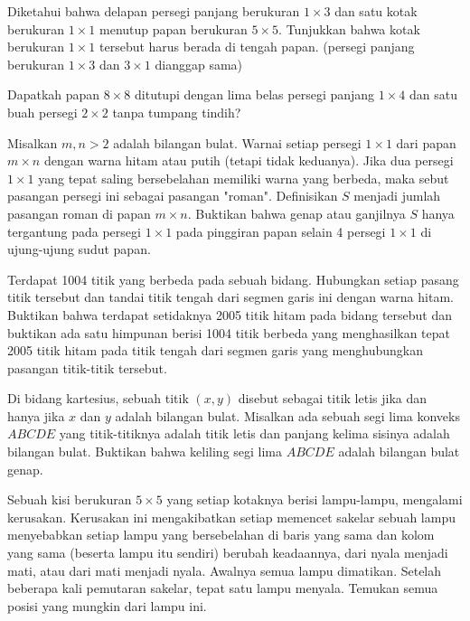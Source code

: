 \documentclass[11pt]{scrartcl}
\begin{document}
\begin{soaljawab}
    Diketahui bahwa delapan persegi panjang berukuran $1 \times 3$ dan satu kotak berukuran $1 \times 1$ menutup papan berukuran $5 \times 5$. Tunjukkan bahwa kotak berukuran $1 \times 1$ tersebut harus berada di tengah papan. (persegi panjang berukuran $1 \times 3$ dan $3 \times 1$ dianggap sama)
\end{soaljawab}

\begin{soaljawab}
    Dapatkah papan $8\times8$ ditutupi dengan lima belas persegi panjang $1\times4$ dan satu buah persegi $2\times2$ tanpa tumpang tindih?
\end{soaljawab}

\begin{soaljawab}
    Misalkan $m,n > 2$ adalah bilangan bulat. Warnai setiap persegi $1\times1$ dari papan $m\times n$ dengan warna hitam atau putih (tetapi tidak keduanya). Jika dua persegi $1\times1$ yang tepat saling bersebelahan memiliki warna yang berbeda, maka sebut pasangan persegi ini sebagai pasangan "roman". Definisikan $S$ menjadi jumlah pasangan roman di papan $m\times n$. Buktikan bahwa genap atau ganjilnya $S$ hanya tergantung pada persegi $1\times1$ pada pinggiran papan selain 4 persegi $1\times1$ di ujung-ujung sudut papan.
\end{soaljawab}

\begin{soaljawab}
    Terdapat 1004 titik yang berbeda pada sebuah bidang. Hubungkan setiap pasang titik tersebut dan tandai titik tengah dari segmen garis ini dengan warna hitam. Buktikan bahwa terdapat setidaknya 2005 titik hitam pada bidang tersebut dan buktikan ada satu himpunan berisi 1004 titik berbeda yang menghasilkan tepat 2005 titik hitam pada titik tengah dari segmen garis yang menghubungkan pasangan titik-titik tersebut.
\end{soaljawab}

\begin{soaljawab}
    Di bidang kartesius, sebuah titik $(x,y)$ disebut sebagai titik letis jika dan
hanya jika $x$ dan $y$ adalah bilangan bulat. Misalkan ada sebuah segi lima konveks $ABCDE$
yang titik-titiknya adalah titik letis dan panjang kelima sisinya adalah bilangan bulat.
Buktikan bahwa keliling segi lima $ABCDE$ adalah bilangan bulat genap.
\end{soaljawab}

\begin{soaljawab}
    Sebuah kisi berukuran $5 \times 5$ yang setiap kotaknya berisi lampu-lampu, mengalami kerusakan. Kerusakan ini mengakibatkan setiap memencet sakelar sebuah lampu menyebabkan setiap lampu yang bersebelahan di baris yang sama dan kolom yang sama (beserta lampu itu sendiri) berubah keadaannya, dari nyala menjadi mati, atau dari mati menjadi nyala. Awalnya semua lampu dimatikan. Setelah beberapa kali pemutaran sakelar, tepat satu lampu menyala. Temukan semua posisi yang mungkin dari lampu ini.
\end{soaljawab}
\end{document}
